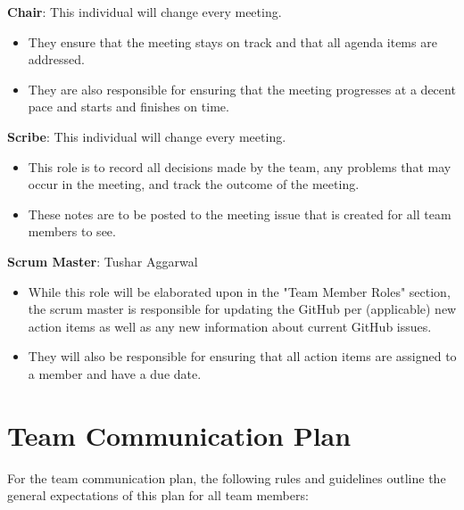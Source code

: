 \documentclass{article}
\begin{document}
\begin{itemize}
\begin{item}
\textbf{Chair}: This individual will change every meeting.
\begin{itemize}
\item They ensure that the meeting stays on track and that all agenda items are addressed.
\item They are also responsible for ensuring that the meeting progresses at a decent pace and starts and finishes on time.
\end{itemize}
\end{item}
\begin{item}
\textbf{Scribe}: This individual will change every meeting.
\begin{itemize}
\item This role is to record all decisions made by the team, any problems that may occur in the meeting, and track the outcome of the meeting.
\item These notes are to be posted to the meeting issue that is created for all team members to see.
\end{itemize}
\end{item}
\begin{item}
\textbf{Scrum Master}: Tushar Aggarwal
\begin{itemize}
\item While this role will be elaborated upon in the "Team Member Roles" section, the scrum master is responsible for updating the GitHub per (applicable) new action items as well as any new information about current GitHub issues.
\item They will also be responsible for ensuring that all action items are assigned to a member and have a due date.
\end{itemize}
\end{item}
\end{itemize}

\section{Team Communication Plan}

For the team communication plan, the following rules and guidelines outline the general expectations of this plan for all team members: 
\end{document}
